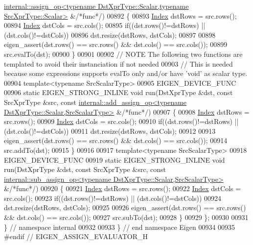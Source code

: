 \begin{DoxyCode}
      \hyperlink{struct_eigen_1_1internal_1_1assign__op}{internal::assign\_op<typename DstXprType::Scalar,typename SrcXprType::Scalar>}
       &\textcolor{comment}{/*func*/})
00892   \{
00893     \hyperlink{namespace_eigen_a62e77e0933482dafde8fe197d9a2cfde}{Index} dstRows = src.rows();
00894     \hyperlink{namespace_eigen_a62e77e0933482dafde8fe197d9a2cfde}{Index} dstCols = src.cols();
00895     \textcolor{keywordflow}{if}((dst.rows()!=dstRows) || (dst.cols()!=dstCols))
00896       dst.resize(dstRows, dstCols);
00897 
00898     eigen\_assert(dst.rows() == src.rows() && dst.cols() == src.cols());
00899     src.evalTo(dst);
00900   \}
00901 
00902   \textcolor{comment}{// NOTE The following two functions are templated to avoid their instanciation if not needed}
00903   \textcolor{comment}{//      This is needed because some expressions supports evalTo only and/or have 'void' as scalar type.}
00904   \textcolor{keyword}{template}<\textcolor{keyword}{typename} SrcScalarType>
00905   EIGEN\_DEVICE\_FUNC
00906   \textcolor{keyword}{static} EIGEN\_STRONG\_INLINE \textcolor{keywordtype}{void} run(DstXprType &dst, \textcolor{keyword}{const} SrcXprType &src, \textcolor{keyword}{const} 
      \hyperlink{struct_eigen_1_1internal_1_1add__assign__op}{internal::add\_assign\_op<typename DstXprType::Scalar,SrcScalarType>}
       &\textcolor{comment}{/*func*/})
00907   \{
00908     \hyperlink{namespace_eigen_a62e77e0933482dafde8fe197d9a2cfde}{Index} dstRows = src.rows();
00909     \hyperlink{namespace_eigen_a62e77e0933482dafde8fe197d9a2cfde}{Index} dstCols = src.cols();
00910     \textcolor{keywordflow}{if}((dst.rows()!=dstRows) || (dst.cols()!=dstCols))
00911       dst.resize(dstRows, dstCols);
00912 
00913     eigen\_assert(dst.rows() == src.rows() && dst.cols() == src.cols());
00914     src.addTo(dst);
00915   \}
00916 
00917   \textcolor{keyword}{template}<\textcolor{keyword}{typename} SrcScalarType>
00918   EIGEN\_DEVICE\_FUNC
00919   \textcolor{keyword}{static} EIGEN\_STRONG\_INLINE \textcolor{keywordtype}{void} run(DstXprType &dst, \textcolor{keyword}{const} SrcXprType &src, \textcolor{keyword}{const} 
      \hyperlink{struct_eigen_1_1internal_1_1sub__assign__op}{internal::sub\_assign\_op<typename DstXprType::Scalar,SrcScalarType>}
       &\textcolor{comment}{/*func*/})
00920   \{
00921     \hyperlink{namespace_eigen_a62e77e0933482dafde8fe197d9a2cfde}{Index} dstRows = src.rows();
00922     \hyperlink{namespace_eigen_a62e77e0933482dafde8fe197d9a2cfde}{Index} dstCols = src.cols();
00923     \textcolor{keywordflow}{if}((dst.rows()!=dstRows) || (dst.cols()!=dstCols))
00924       dst.resize(dstRows, dstCols);
00925 
00926     eigen\_assert(dst.rows() == src.rows() && dst.cols() == src.cols());
00927     src.subTo(dst);
00928   \}
00929 \};
00930 
00931 \} \textcolor{comment}{// namespace internal}
00932 
00933 \} \textcolor{comment}{// end namespace Eigen}
00934 
00935 \textcolor{preprocessor}{#endif // EIGEN\_ASSIGN\_EVALUATOR\_H}
\end{DoxyCode}
